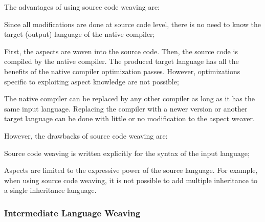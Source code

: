 The advantages of using source code weaving are:
\begin{description}[style=nextline,noitemsep]
  \item[High-level source modification] Since all modifications are done at source code level, there is no need to know the target (output) language of the native compiler;
  \item[Aspect and original source optimization] First, the aspects are woven into the source code. Then, the source code is compiled by the native compiler.
       The produced target language has all the benefits of the native compiler optimization passes.
       However, optimizations specific to exploiting aspect knowledge are not possible;
  \item[Native compiler portability] The native compiler can be replaced by any other compiler as long as it has the same input language.
       Replacing the compiler with a newer version or another target language can be done with little or no modification to the aspect weaver.
\end{description}

However, the drawbacks of source code weaving are:
\begin{description}[style=nextline,noitemsep]
  \item[Language dependency] Source code weaving is written explicitly for the syntax of the input language;
  \item[Limited expressiveness] Aspects are limited to the expressive power of the source language.
       For example, when using source code weaving, it is not possible to add multiple inheritance to a single inheritance language.
\end{description}

\subsubsection{Intermediate Language Weaving}
\label{sec:intermediate_language_weaving}

